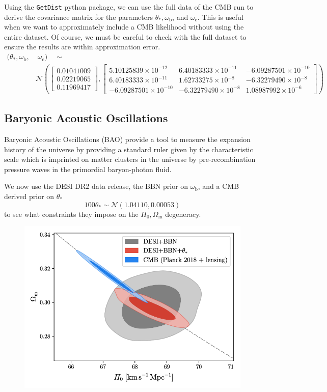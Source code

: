 \documentclass{lkx_paper}
\renewcommand{\b}{{\mathrm{b}}}
\renewcommand{\c}{{\mathrm{c}}}
\newcommand{\m}{{\mathrm{m}}}
\newcommand{\NN}{{\mathcal{N}}}
\begin{document}
Using the \texttt{GetDist} python package, we can use the full data of the CMB run to derive the covariance matrix for the parameters $\theta_*, \omega_\b$, and $\omega_\c$. This is useful when we want to approximately include a CMB likelihood without using the entire dataset. Of course, we must be careful to check with the full dataset to ensure the results are within approximation error. 
  \[ 
    \begin{aligned}
      (\theta_*, \omega_\b,&\; \omega_\c) \quad\sim\quad\\ 
                                              &\NN\left(
\begin{bmatrix}
0.01041009 \\
0.02219065 \\
0.11969417
\end{bmatrix},
\begin{bmatrix}
5.10125839\times10^{-12} & 6.40183333\times10^{-11} & -6.09287501\times10^{-10} \\
6.40183333\times10^{-11} & 1.62733275\times10^{-8}  & -6.32279490\times10^{-8}  \\
-6.09287501\times10^{-10} & -6.32279490\times10^{-8} & 1.08987992\times10^{-6}
\end{bmatrix}\right)
    \end{aligned}
\]

\subsection*{Baryonic Acoustic Oscillations}

Baryonic Acoustic Oscillations (BAO) provide a tool to measure the expansion history of the universe by providing a standard ruler given by the characteristic scale which is imprinted on matter clusters in the universe by pre-recombination pressure waves in the primordial baryon-photon fluid.

We now use the DESI DR2 data release, the BBN prior on $\omega_\b$, and a CMB derived prior on $\theta_*$
\[
    100\theta_* \sim \NN(1.04110, 0.00053)
\]
to see what constraints they impose on the $H_0,\Omega_\m$ degeneracy.

\begin{figure}[H]
  \centering
  \includegraphics[scale=0.8]{figures/H0-omegam.pdf}
\end{figure}
\end{document}
